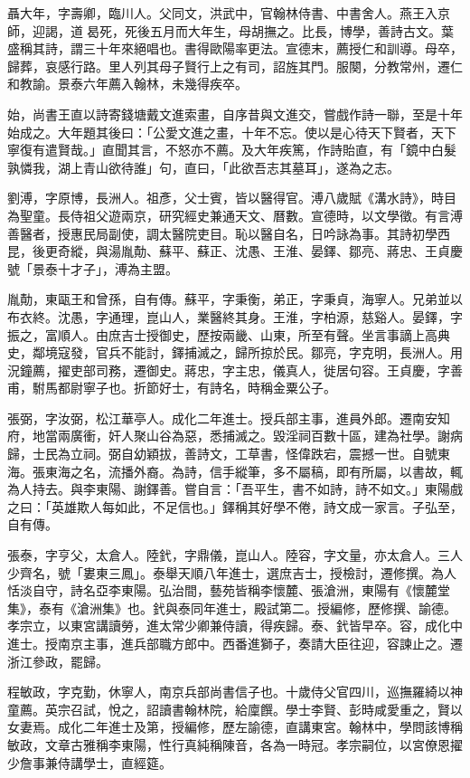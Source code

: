 \begin{pinyinscope}
聶大年，字壽卿，臨川人。父同文，洪武中，官翰林侍書、中書舍人。燕王入京師，迎謁，道曷死，死後五月而大年生，母胡撫之。比長，博學，善詩古文。葉盛稱其詩，謂三十年來絕唱也。書得歐陽率更法。宣德末，薦授仁和訓導。母卒，歸葬，哀感行路。里人列其母子賢行上之有司，詔旌其門。服闋，分教常州，遷仁和教諭。景泰六年薦入翰林，未幾得疾卒。

始，尚書王直以詩寄錢塘戴文進索畫，自序昔與文進交，嘗戲作詩一聯，至是十年始成之。大年題其後曰：「公愛文進之畫，十年不忘。使以是心待天下賢者，天下寧復有遣賢哉。」直聞其言，不怒亦不薦。及大年疾篤，作詩貽直，有「鏡中白髮孰憐我，湖上青山欲待誰」句，直曰，「此欲吾志其墓耳」，遂為之志。

劉溥，字原博，長洲人。祖彥，父士賓，皆以醫得官。溥八歲賦《溝水詩》，時目為聖童。長侍祖父遊兩京，研究經史兼通天文、曆數。宣德時，以文學徵。有言溥善醫者，授惠民局副使，調太醫院吏目。恥以醫自名，日吟詠為事。其詩初學西昆，後更奇縱，與湯胤勣、蘇平、蘇正、沈愚、王淮、晏鐸、鄒亮、蔣忠、王貞慶號「景泰十才子」，溥為主盟。

胤勣，東甌王和曾孫，自有傳。蘇平，字秉衡，弟正，字秉貞，海寧人。兄弟並以布衣終。沈愚，字通理，崑山人，業醫終其身。王淮，字柏源，慈谿人。晏鐸，字振之，富順人。由庶吉士授御史，歷按兩畿、山東，所至有聲。坐言事謫上高典史，鄰境寇發，官兵不能討，鐸捕滅之，歸所掠於民。鄒亮，字克明，長洲人。用況鐘薦，擢吏部司務，遷御史。蔣忠，字主忠，儀真人，徙居句容。王貞慶，字善甫，駙馬都尉寧子也。折節好士，有詩名，時稱金粟公子。

張弼，字汝弼，松江華亭人。成化二年進士。授兵部主事，進員外郎。遷南安知府，地當兩廣衝，奸人聚山谷為惡，悉捕滅之。毀淫祠百數十區，建為社學。謝病歸，士民為立祠。弼自幼穎拔，善詩文，工草書，怪偉跌宕，震撼一世。自號東海。張東海之名，流播外裔。為詩，信手縱筆，多不屬稿，即有所屬，以書故，輒為人持去。與李東陽、謝鐸善。嘗自言：「吾平生，書不如詩，詩不如文。」東陽戲之曰：「英雄欺人每如此，不足信也。」鐸稱其好學不倦，詩文成一家言。子弘至，自有傳。

張泰，字亨父，太倉人。陸釴，字鼎儀，崑山人。陸容，字文量，亦太倉人。三人少齊名，號「婁東三鳳」。泰舉天順八年進士，選庶吉士，授檢討，遷修撰。為人恬淡自守，詩名亞李東陽。弘治間，藝苑皆稱李懷麓、張滄洲，東陽有《懷麓堂集》，泰有《滄洲集》也。釴與泰同年進士，殿試第二。授編修，歷修撰、諭德。孝宗立，以東宮講讀勞，進太常少卿兼侍讀，得疾歸。泰、釴皆早卒。容，成化中進士。授南京主事，進兵部職方郎中。西番進獅子，奏請大臣往迎，容諫止之。遷浙江參政，罷歸。

程敏政，字克勤，休寧人，南京兵部尚書信子也。十歲侍父官四川，巡撫羅綺以神童薦。英宗召試，悅之，詔讀書翰林院，給廩饌。學士李賢、彭時咸愛重之，賢以女妻焉。成化二年進士及第，授編修，歷左諭德，直講東宮。翰林中，學問該博稱敏政，文章古雅稱李東陽，性行真純稱陳音，各為一時冠。孝宗嗣位，以宮僚恩擢少詹事兼侍講學士，直經筵。


\end{pinyinscope}
